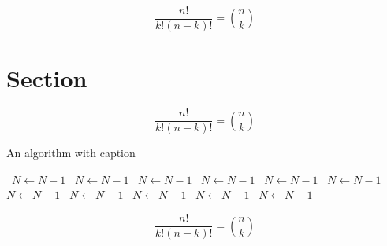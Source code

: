 \documentclass[a4paper]{article}
\begin{document}
\[ \frac{n!}{k!(n-k)!} = \binom{n}{k} \]

\section{Section}

\[ \frac{n!}{k!(n-k)!} = \binom{n}{k} \]

\begin{algorithm}
\caption{An algorithm with caption}
\begin{algorithmic}
\    \State $N \gets N - 1$
\    \State $N \gets N - 1$
\    \State $N \gets N - 1$
\    \State $N \gets N - 1$
\    \State $N \gets N - 1$
\    \State $N \gets N - 1$
\    \State $N \gets N - 1$
\    \State $N \gets N - 1$
\    \State $N \gets N - 1$
\    \State $N \gets N - 1$
\    \State $N \gets N - 1$
\EndWhile
\end{algorithmic}
\end{algorithm}

\[ \frac{n!}{k!(n-k)!} = \binom{n}{k} \]
\end{document}
